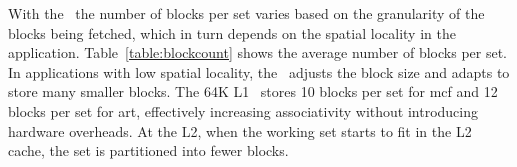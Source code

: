 {With the \AC\, the number of blocks per set varies based on the granularity of the blocks being fetched, which in turn depends on the spatial locality in the application. Table~\ref{table:blockcount} shows the average number of blocks per set. In applications with low spatial locality, the \AC\ adjusts the block size and adapts to store many smaller blocks. The 64K L1 \AC\ stores 10 blocks per set for mcf and 12 blocks per set for art, effectively increasing associativity without introducing hardware overheads. At the L2, when the working set starts to fit in the L2 cache, the set is partitioned into fewer blocks. 

\begin{figure}[ht]

  
    

\end{figure}}
